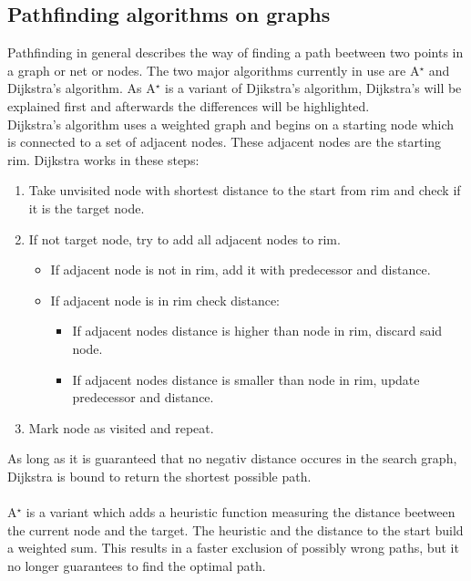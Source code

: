 \subsection{Pathfinding algorithms on graphs}
Pathfinding in general describes the way of finding a path beetween two points in a graph or net or nodes. The two major algorithms currently in use are A$^\star$ and Dijkstra's algorithm. As A$^\star$ is a variant of Djikstra's algorithm, Dijkstra's will be explained first and afterwards the differences will be highlighted.\\
Dijkstra's algorithm uses a weighted graph and begins on a starting node which is connected to a set of adjacent nodes. These adjacent nodes are the starting rim.
Dijkstra works in these steps:
\begin{enumerate}
\item Take unvisited node with shortest distance to the start from rim and check if it is the target node.
\item If not target node, try to add all adjacent nodes to rim.
\begin{itemize}
\item If adjacent node is not in rim, add it with predecessor and distance.
\item If adjacent node is in rim check distance:
\begin{itemize}
\item If adjacent nodes distance is higher than node in rim, discard said node.
\item If adjacent nodes distance is smaller than node in rim, update predecessor and distance.
\end{itemize}
\end{itemize}
\item Mark node as visited and repeat.
\end{enumerate} 
As long as it is guaranteed that no negativ distance occures in the search graph, Dijkstra is bound to return the shortest possible path.\\\\
A$^\star$ is a variant which adds a heuristic function measuring the distance beetween the current node and the target. The heuristic and the distance to the start build a weighted sum. This results in a faster exclusion of possibly wrong paths, but it no longer guarantees to find the optimal path.